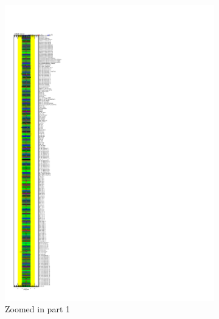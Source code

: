 \begin{figure}[ht]
  \centering
  \begin{subfigure}[b]{0.45\textwidth}
      \includegraphics[width=\textwidth, viewport=0 0 100 100, clip]{figures/diff_xsec/dilep_tty_prod_mu_blinded/compare_NP_pulls/compare_NP_dilep_fits_pt_ptj1_ptll/NuisPar_comp.pdf}
      \caption{Zoomed in part 1}
  \end{subfigure}
  \hfill
  \begin{subfigure}[b]{0.45\textwidth}

\end{subfigure}
\end{figure}
